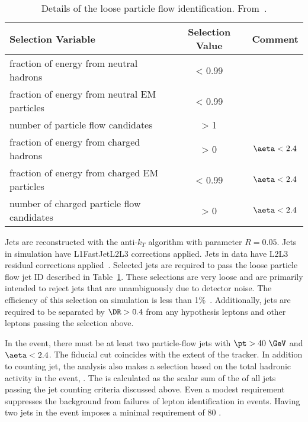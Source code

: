 \begin{table}[!hbt]
\begin{center}
\begin{tabular}{l|c|c}
\hline\hline
Selection Variable                           & Selection Value & Comment       \\ \hline
fraction of energy from neutral hadrons      & < 0.99          &               \\ 
fraction of energy from neutral EM particles & < 0.99          &               \\ 
number of particle flow candidates           & > 1             &               \\ 
fraction of energy from charged hadrons      & > 0             & $\aeta < 2.4$ \\ 
fraction of energy from charged EM particles & < 0.99          & $\aeta < 2.4$ \\ 
number of charged particle flow candidates   & > 0             & $\aeta < 2.4$ \\ 
\hline\hline
\end{tabular}
\caption{\label{tab:evtsel_jetid}
Details of the loose particle flow identification. From~\cite{an_003_2010}.
}
\end{center}
\end{table}
Jets are reconstructed with the anti-$k_T$
algorithm with parameter $R = 0.05$. Jets in simulation have L1FastJetL2L3
corrections applied. Jets in data have L2L3 residual corrections
applied~\cite{jetcorrtwiki}. Selected jets are required to pass the loose
particle flow jet ID described in Table~\ref{tab:evtsel_jetid}. These
selections are very loose and are primarily intended to reject jets that are
unambiguously due to detector noise. The efficiency of this selection on
simulation is less than 1\%~\cite{an_003_2010}. Additionally, jets are required to be
separated by $\DR > 0.4$ from any hypothesis leptons and other leptons passing
the selection above.

In the event, there must be at least two particle-flow jets with $\pt > 40\
\GeV$ and $\aeta < 2.4$. The fiducial cut coincides with the extent of the
tracker. In addition to counting jet, the analysis also makes a selection based
on the total hadronic activity in the event, \Ht. The \Ht is calculated as the
scalar sum of the \pt of all jets passing the jet counting criteria discussed
above. Even a modest \Ht requirement suppresses the background from failures of
lepton identification in \Wj events. Having two jets in the event imposes
a minimal \Ht requirement of 80 \GeV.

